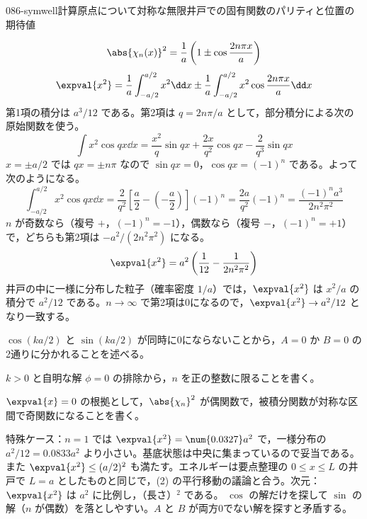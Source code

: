 \documentclass[uplatex,dvipdfmx,a4paper,11pt]{jsarticle}
\begin{document}
\begin{mondai}{086-symwell}{計算}{原点について対称な無限井戸での固有関数のパリティと位置の期待値}
\begin{tadashii}
\[ \abs{\chi_{n}(x)}^{2}=\frac{1}{a}\left(1\pm\cos\frac{2n\pi x}{a}\right) \]
\[ \expval{x^{2}}=\frac{1}{a}\int_{-a/2}^{a/2}x^{2}\dd x\pm\frac{1}{a}\int_{-a/2}^{a/2}x^{2}\cos\frac{2n\pi x}{a}\dd x \]
第1項の積分は $a^{3}/12$ である。第2項は $q=2n\pi/a$ として，部分積分による次の原始関数を使う。
\[ \int x^{2}\cos qx\dd x=\frac{x^{2}}{q}\sin qx+\frac{2x}{q^{2}}\cos qx-\frac{2}{q^{3}}\sin qx \]
$x=\pm a/2$ では $qx=\pm n\pi$ なので $\sin qx=0$，$\cos qx=(-1)^{n}$ である。よって次のようになる。
\[ \int_{-a/2}^{a/2}x^{2}\cos qx\dd x=\frac{2}{q^{2}}\left[\frac{a}{2}-\left(-\frac{a}{2}\right)\right](-1)^{n}=\frac{2a}{q^{2}}(-1)^{n}=\frac{(-1)^{n}a^{3}}{2n^{2}\pi^{2}} \]
$n$ が奇数なら（複号 $+$，$(-1)^{n}=-1$），偶数なら（複号 $-$，$(-1)^{n}=+1$）で，どちらも第2項は $-a^{2}/(2n^{2}\pi^{2})$ になる。
\[ \expval{x^{2}}=a^{2}\left(\frac{1}{12}-\frac{1}{2n^{2}\pi^{2}}\right) \]
井戸の中に一様に分布した粒子（確率密度 $1/a$）では，$\expval{x^{2}}$ は $x^{2}/a$ の積分で $a^{2}/12$ である。$n\to\infty$ で第2項は0になるので，$\expval{x^{2}}\to a^{2}/12$ となり一致する。
\begin{ronten}
  \item {} $\cos(ka/2)$ と $\sin(ka/2)$ が同時に0にならないことから，$A=0$ か $B=0$ の2通りに分かれることを述べる。
  \item {} $k>0$ と自明な解 $\phi=0$ の排除から，$n$ を正の整数に限ることを書く。
  \item {} $\expval{x}=0$ の根拠として，$\abs{\chi_{n}}^{2}$ が偶関数で，被積分関数が対称な区間で奇関数になることを書く。
\end{ronten}
\kenzan 特殊ケース：$n=1$ では $\expval{x^{2}}=\num{0.0327}a^{2}$ で，一様分布の $a^{2}/12=\num{0.0833}a^{2}$ より小さい。基底状態は中央に集まっているので妥当である。また $\expval{x^{2}}\le(a/2)^{2}$ も満たす。エネルギーは要点整理の $0\le x\le L$ の井戸で $L=a$ としたものと同じで，(2) の平行移動の議論と合う。次元：$\expval{x^{2}}$ は $a^{2}$ に比例し，（長さ）$^{2}$ である。
\tsumazuki $\cos$ の解だけを探して $\sin$ の解（$n$ が偶数）を落としやすい。$A$ と $B$ が両方0でない解を探すと矛盾する。
\end{tadashii}
\end{mondai}
\end{document}
